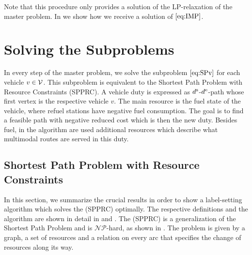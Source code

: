 Note that this procedure only provides a solution of the LP-relaxation of the master problem. In  we show how we receive a solution of $\eqref{eq:IMP}$.


\section{Solving the Subproblems}
\label{sec:solving_subproblem}

In every step of the master problem, we solve the subproblem $\eqref{eq:SPv}$ for each vehicle $v\in\mathcal{V}$. This subproblem is equivalent to the Shortest Path Problem with Resource Constraints (SPPRC). A vehicle duty is expressed as $d^{\operatorname{s}}$-$d^{\operatorname{e}}$-path whose first vertex is the respective vehicle $v$. The main resource is the fuel state of the vehicle, where refuel stations have negative fuel consumption. The goal is to find a feasible path with negative reduced cost which is then the new duty. Besides fuel, in the algorithm are used additional resources which describe what multimodal routes are served in this duty.

\subsection{Shortest Path Problem with Resource Constraints}
\label{sec:spprc}

In this section, we summarize the crucial results in order to show a label-setting algorithm which solves the (SPPRC) optimally. The respective definitions and the algorithm are shown in detail in \cite{Kaiser} and \cite{Irnich_Desaulniers}. The (SPPRC) is a generalization of the Shortest Path Problem and is $\mathcal{NP}$-hard, as shown in \cite[p.307]{Handler_Zang}. The problem is given by a graph, a set of resources and a relation on every arc that specifies the change of resources along its way. 

